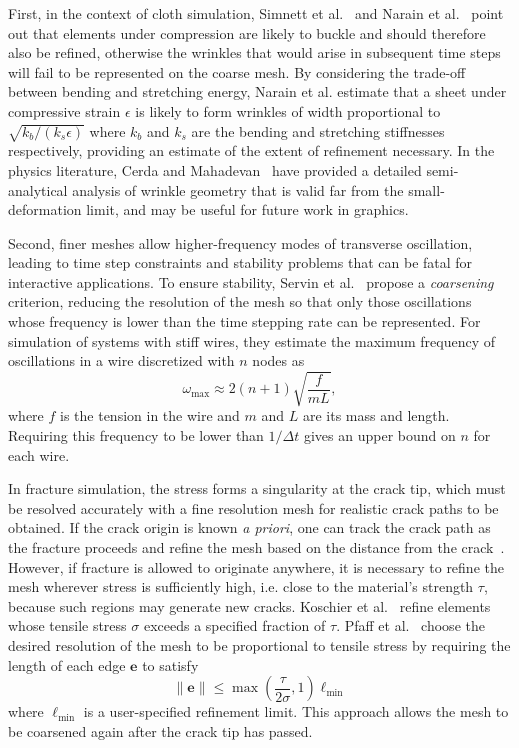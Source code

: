 First, in the context of cloth simulation, Simnett et al.~\cite{Simnett2009} and Narain et al.~\cite{Narain2012} point out that elements under compression are likely to buckle and should therefore also be refined, otherwise the wrinkles that would arise in subsequent time steps will fail to be represented on the coarse mesh.
By considering the trade-off between bending and stretching energy, Narain et al. estimate that a sheet under compressive strain $\epsilon$ is likely to form wrinkles of width proportional to $\sqrt{k_b/(k_s\epsilon)}$ where $k_b$ and $k_s$ are the bending and stretching stiffnesses respectively, providing an estimate of the extent of refinement necessary.
In the physics literature, Cerda and Mahadevan~\cite{Cerda2003} have provided a detailed semi-analytical analysis of wrinkle geometry that is valid far from the small-deformation limit, and may be useful for future work in graphics.

Second, finer meshes allow higher-frequency modes of transverse oscillation, leading to time step constraints and stability problems that can be fatal for interactive applications.
To ensure stability, Servin et al.~\cite{Servin2008} propose a \emph{coarsening} criterion, reducing the resolution of the mesh so that only those oscillations whose frequency is lower than the time stepping rate can be represented.
For simulation of systems with stiff wires, they estimate the maximum frequency of oscillations in a wire discretized with $n$ nodes as
\begin{equation}
	\omega_{\max} \approx 2(n+1)\sqrt{\frac{f}{mL}},
\end{equation}
where $f$ is the tension in the wire and $m$ and $L$ are its mass and length.
Requiring this frequency to be lower than $1/\Delta t$ gives an upper bound on $n$ for each wire.

In fracture simulation, the stress forms a singularity at the crack tip, which must be resolved accurately with a fine resolution mesh for realistic crack paths to be obtained.
If the crack origin is known \textit{a priori}, one can track the crack path as the fracture proceeds and refine the mesh based on the distance from the crack~\cite{Busaryev2013}.
However, if fracture is allowed to originate anywhere, it is necessary to refine the mesh wherever stress is sufficiently high, i.e. close to the material's strength $\tau$, because such regions may generate new cracks.
Koschier et al.~\cite{Koschier2014} refine elements whose tensile stress $\sigma$ exceeds a specified fraction of $\tau$.
Pfaff et al.~\cite{Pfaff2014} choose the desired resolution of the mesh to be proportional to tensile stress by requiring the length of each edge $\mathbf e$ to satisfy
\begin{equation}
	\|\mathbf e\|\le\max\left(\frac{\tau}{2\sigma},1\right)\ell_{\min}
\end{equation}
where $\ell_{\min}$ is a user-specified refinement limit.
This approach allows the mesh to be coarsened again after the crack tip has passed.

